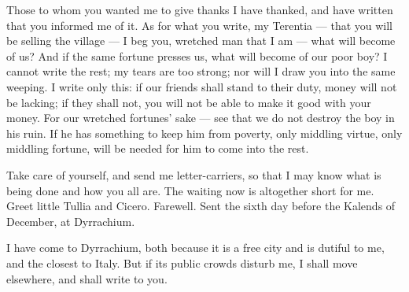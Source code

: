  Those to whom you wanted me to give thanks I have thanked, and have written that you informed me of it. As for what you write, my Terentia --- that you will be selling the village --- I beg you, wretched man that I am --- what will become of us? And if the same fortune presses us, what will become of our poor boy? I cannot write the rest; my tears are too strong; nor will I draw you into the same weeping. I write only this: if our friends shall stand to their duty, money will not be lacking; if they shall not, you will not be able to make it good with your money. For our wretched fortunes' sake --- see that we do not destroy the boy in his ruin. If he has something to keep him from poverty, only middling virtue, only middling fortune, will be needed for him to come into the rest.

 Take care of yourself, and send me letter-carriers, so that I may know what is being done and how you all are. The waiting now is altogether short for me. Greet little Tullia and Cicero. Farewell. Sent the sixth day before the Kalends of December, at Dyrrachium.

 I have come to Dyrrachium, both because it is a free city and is dutiful to me, and the closest to Italy. But if its public crowds disturb me, I shall move elsewhere, and shall write to you.
